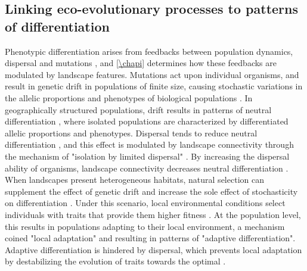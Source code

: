 \subsection{Linking eco-evolutionary processes to patterns of differentiation}

Phenotypic differentiation arises from feedbacks between population dynamics, dispersal and mutations \citep{hamilton2021population}, and \cref{\chapi} determines how these feedbacks are modulated by landscape features.
% 
Mutations act upon individual organisms, and result in genetic drift in populations of finite size, causing stochastic variations in the allelic proportions and phenotypes of biological populations \citep{Slatkin1987a}.
% 
% 
In geographically structured populations, drift results in patterns of neutral differentiation \citep{Slatkin1987a}, where isolated populations are characterized by differentiated allelic proportions and phenotypes. 
% 
Dispersal tends to reduce neutral differentiation \citep{Slatkin1987a}, and this effect is modulated by landscape connectivity \citep{Wright1943,McRae2006,McRae2007} through the mechanism of "isolation by limited dispersal" \citep{Orsini2013}. By increasing the dispersal ability of organisms, landscape connectivity decreases neutral differentiation \citep{Lande1991}.
% 
When landscapes present heterogeneous habitats, natural selection can supplement the effect of genetic drift and increase the sole effect of stochasticity on differentiation \citep{fisher1958genetical}. Under this scenario, local environmental conditions select individuals with traits that provide them higher fitness \citep{Gaither2018}. At the population level, this results in populations adapting to their local environment, a mechanism coined "local adaptation" \citep{Kawecki2004} and resulting in patterns of "adaptive differentiation". 
% 
% 
Adaptive differentiation is hindered by dispersal, which prevents local adaptation by destabilizing the evolution of traits towards the optimal \citep{Meszena1997,Debarre2013,Mirrahimi2020}.
% 
